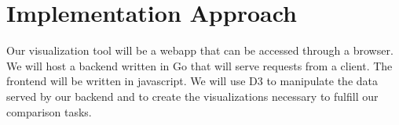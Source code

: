 \section{Implementation Approach}

Our visualization tool will be a webapp that can be accessed through a browser. We will host a backend written in Go that 
will serve requests from a client. The frontend will be written in javascript. We will use D3 to manipulate the data served
by our backend and to create the visualizations necessary to fulfill our comparison tasks.